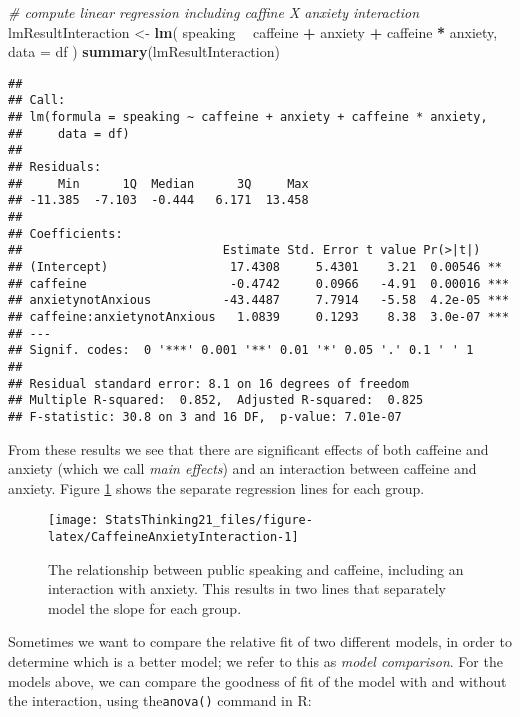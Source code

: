 \documentclass[]{book}
\newenvironment{Shaded}{\begin{snugshade}}{\end{snugshade}}
\newcommand{\KeywordTok}[1]{\textcolor[rgb]{0.13,0.29,0.53}{\textbf{#1}}}
\newcommand{\DataTypeTok}[1]{\textcolor[rgb]{0.13,0.29,0.53}{#1}}
\newcommand{\StringTok}[1]{\textcolor[rgb]{0.31,0.60,0.02}{#1}}
\newcommand{\CommentTok}[1]{\textcolor[rgb]{0.56,0.35,0.01}{\textit{#1}}}
\newcommand{\OperatorTok}[1]{\textcolor[rgb]{0.81,0.36,0.00}{\textbf{#1}}}
\newcommand{\NormalTok}[1]{#1}
\theoremstyle{definition}
\theoremstyle{definition}
\theoremstyle{definition}
\theoremstyle{remark}
\begin{document}
\begin{Shaded}
\begin{Highlighting}[]
\CommentTok{# compute linear regression including caffine X anxiety interaction}
\NormalTok{lmResultInteraction <-}\StringTok{ }\KeywordTok{lm}\NormalTok{(}
\NormalTok{  speaking }\OperatorTok{~}\StringTok{ }\NormalTok{caffeine }\OperatorTok{+}\StringTok{ }\NormalTok{anxiety }\OperatorTok{+}\StringTok{ }\NormalTok{caffeine }\OperatorTok{*}\StringTok{ }\NormalTok{anxiety,}
  \DataTypeTok{data =}\NormalTok{ df}
\NormalTok{)}
\KeywordTok{summary}\NormalTok{(lmResultInteraction)}
\end{Highlighting}
\end{Shaded}

\begin{verbatim}
## 
## Call:
## lm(formula = speaking ~ caffeine + anxiety + caffeine * anxiety, 
##     data = df)
## 
## Residuals:
##     Min      1Q  Median      3Q     Max 
## -11.385  -7.103  -0.444   6.171  13.458 
## 
## Coefficients:
##                            Estimate Std. Error t value Pr(>|t|)    
## (Intercept)                 17.4308     5.4301    3.21  0.00546 ** 
## caffeine                    -0.4742     0.0966   -4.91  0.00016 ***
## anxietynotAnxious          -43.4487     7.7914   -5.58  4.2e-05 ***
## caffeine:anxietynotAnxious   1.0839     0.1293    8.38  3.0e-07 ***
## ---
## Signif. codes:  0 '***' 0.001 '**' 0.01 '*' 0.05 '.' 0.1 ' ' 1
## 
## Residual standard error: 8.1 on 16 degrees of freedom
## Multiple R-squared:  0.852,  Adjusted R-squared:  0.825 
## F-statistic: 30.8 on 3 and 16 DF,  p-value: 7.01e-07
\end{verbatim}

From these results we see that there are significant effects of both
caffeine and anxiety (which we call \emph{main effects}) and an
interaction between caffeine and anxiety. Figure
\ref{fig:CaffeineAnxietyInteraction} shows the separate regression lines
for each group.

\begin{figure}
\texttt{[image: StatsThinking21\_files/figure-latex/CaffeineAnxietyInteraction-1]} \caption{The relationship between public speaking and caffeine, including an interaction with anxiety.  This results in two lines that separately model the slope for each group.}\label{fig:CaffeineAnxietyInteraction}
\end{figure}

Sometimes we want to compare the relative fit of two different models,
in order to determine which is a better model; we refer to this as
\emph{model comparison}. For the models above, we can compare the
goodness of fit of the model with and without the interaction, using
the\texttt{anova()} command in R:
\end{document}
